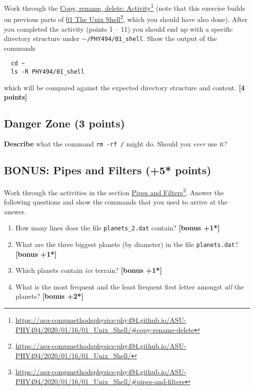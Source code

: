 \documentclass[letterpaper]{scrartcl}
\newcommand{\bonus}[1]{\textbf{[bonus +#1*]}}
\newcommand{\points}[1]{\textbf{[#1 points]}}
\newenvironment{enuma}{\begin{enumerate}[label=(\alph*)]}{\end{enumerate}}
\newcommand{\fnhref}[2]{\href{#1}{#2}\footnote{\url{#1}}}
\begin{document}
Work through the
\fnhref{https://asu-compmethodsphysics-phy494.github.io/ASU-PHY494/2020/01/16/01_Unix_Shell/\#copy-rename-delete}{Copy,
  rename, delete: Activity} (note that this exercise builds on
previous parts of
\fnhref{https://asu-compmethodsphysics-phy494.github.io/ASU-PHY494/2020/01/16/01_Unix_Shell/}{01
  The Unix Shell}, which you should have also done). After you
completed the activity (points 1 -- 11) you should end up with a
specific directory structure under
\texttt{$\sim$/PHY494/01\_shell}. Show the output of the commands
\begin{lstlisting}
  cd ~
  ls -R PHY494/01_shell
\end{lstlisting}
which will be compared against the expected directory structure and
content. \points{4}

\subsection{Danger Zone (3 points)}

\begin{center}
\end{center}
\textbf{Describe} what the command \texttt{rm -rf /} might do. Should
you \emph{ever} use it?

\subsection{BONUS: Pipes and Filters (+5* points)}
\label{sec:pipesandfilters}

Work through the activities in the section
\fnhref{https://asu-compmethodsphysics-phy494.github.io/ASU-PHY494/2020/01/16/01_Unix_Shell/\#pipes-and-filters}{Pipes
  and Filters}. Answer the following questions and show the commands
that you used to arrive at the answer.

\begin{enuma}
\item How many lines does the file \texttt{planets\_2.dat} contain? \bonus{1}
\item What are the three biggest planets (by diameter) in the file
  \texttt{planets.dat}? \bonus{1}
\item Which planets contain \emph{ice} terrain? \bonus{1}
\item \label{li:characters} What is the most frequent and the least
  frequent first letter amongst \emph{all} the planets? \bonus{2}
\end{enuma}
\end{document}
